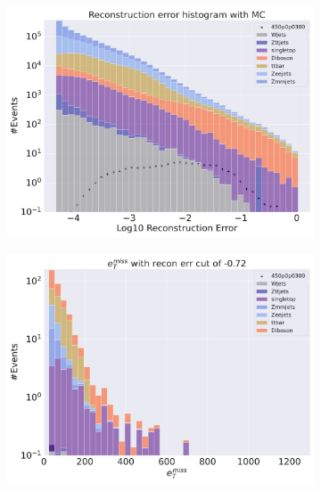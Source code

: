 \begin{figure}[H]
    \centering
    \begin{subfigure}{.40\textwidth}
        \includegraphics[width=\textwidth]{Figures/AE_testing/small/2lep/b_data_recon_big_rm3_feats_sig_450p0p0300_.pdf}
        \caption{ }
        \label{fig:AE_2lep_big_450_3}
    \end{subfigure}
    \hfill
    \begin{subfigure}{.40\textwidth}
        \includegraphics[width=\textwidth]{Figures/AE_testing/big/2lep/b_data_recon_big_rm3_feats_sig_450p0p0300_recon_errcut_-0.72.pdf}
        \caption{}
        \label{fig:AE_2lep_big_etmiss_450_3}
    \end{subfigure}

\end{figure}
